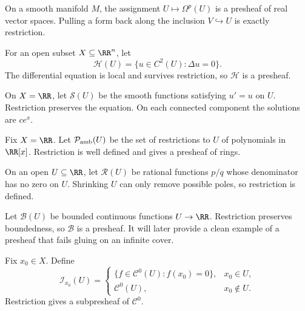 \begin{example}
On a smooth manifold $M$, the assignment $U\mapsto\Omega^p(U)$ is a presheaf of real vector
spaces.  Pulling a form back along the inclusion $V\hookrightarrow U$ is exactly restriction.
\end{example}

\begin{example}
For an open subset $X\subseteq\RR^n$, let
\[
\mathcal H(U)=\{u\in C^2(U):\Delta u=0\}.
\]
The differential equation is local and survives restriction, so $\mathcal H$ is a presheaf.
\end{example}

\begin{example}
On $X=\RR$, let $\mathcal S(U)$ be the smooth functions satisfying $u'=u$ on $U$.  Restriction
preserves the equation.  On each connected component the solutions are $ce^x$.
\end{example}

\begin{example}
Fix $X=\RR$.  Let $\mathcal P_{\rm amb}(U)$ be the set of restrictions to $U$ of polynomials
in $\RR[x]$.  Restriction is well defined and gives a presheaf of rings.
\end{example}

\begin{example}
On an open $U\subseteq\RR$, let $\mathcal R(U)$ be rational functions $p/q$ whose denominator
has no zero on $U$.  Shrinking $U$ can only remove possible poles, so restriction is defined.
\end{example}

\begin{example}
Let $\mathcal B(U)$ be bounded continuous functions $U\to\RR$.  Restriction preserves
boundedness, so $\mathcal B$ is a presheaf.  It will later provide a clean example of a
presheaf that fails gluing on an infinite cover.
\end{example}

\begin{example}
Fix $x_0\in X$.  Define
\[
\mathcal I_{x_0}(U)=
\begin{cases}
\{f\in\mathcal C^0(U):f(x_0)=0\},&x_0\in U,\\
\mathcal C^0(U),&x_0\notin U.
\end{cases}
\]
Restriction gives a subpresheaf of $\mathcal C^0$.
\end{example}

